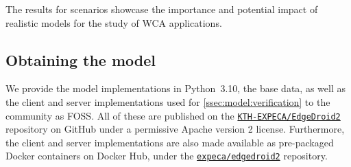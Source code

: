 \medskip

The results for scenarios  showcase the importance and potential impact of realistic models for the study of \ac{WCA} applications.


\subsection{Obtaining the model}\label{ssec:model:obtaining}

We provide the model implementations in Python~\num{3.10}, the base data, as well as the client and server implementations used for \cref{ssec:model:verification} to the community as \ac{FOSS}.
All of these are published on the \href{https://github.com/KTH-EXPECA/EdgeDroid2}{\texttt{KTH-EXPECA/EdgeDroid2}} repository on GitHub under a permissive Apache version 2 license.
Furthermore, the client and server implementations are also made available as pre-packaged Docker containers on Docker Hub, under the \href{https://hub.docker.com/r/expeca/edgedroid2}{\texttt{expeca/edgedroid2}} repository.
